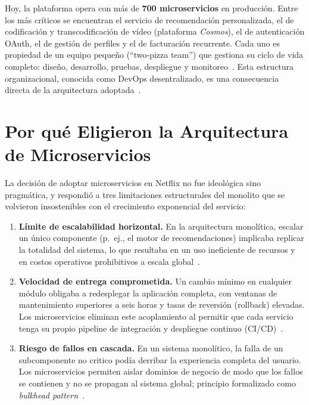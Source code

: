 \documentclass[11pt,a4paper]{article}
\begin{document}
Hoy, la plataforma opera con m\'as de \textbf{700 microservicios} en producci\'on. Entre los
m\'as cr\'iticos se encuentran el servicio de recomendaci\'on personalizada, el de codificaci\'on y
transcodificaci\'on de v\'ideo (plataforma \textit{Cosmos}), el de autenticaci\'on OAuth, el de
gesti\'on de perfiles y el de facturaci\'on recurrente. Cada uno es propiedad de un equipo
peque\~no (``two-pizza team'') que gestiona su ciclo de vida completo: dise\~no, desarrollo,
pruebas, despliegue y monitoreo~\cite{miguel2022}. Esta estructura organizacional,
conocida como DevOps desentralizado, es una consecuencia directa de la arquitectura
adoptada~\cite{balalaie2016}.

\section{Por qu\'e Eligieron la Arquitectura de Microservicios}

La decisi\'on de adoptar microservicios en Netflix no fue ideol\'ogica sino pragm\'atica, y
respondi\'o a tres limitaciones estructurales del monolito que se volvieron insostenibles
con el crecimiento exponencial del servicio:

\begin{enumerate}[leftmargin=*, label=\textbf{\arabic{enumi}.}]

  \item \textbf{L\'imite de escalabilidad horizontal.}
  En la arquitectura monol\'itica, escalar un \'unico componente (p.~ej., el motor de
  recomendaciones) implicaba replicar la totalidad del sistema, lo que resultaba en un
  uso ineficiente de recursos y en costos operativos prohibitivos a escala global~\cite{blinowski2022}.

  \item \textbf{Velocidad de entrega comprometida.}
  Un cambio m\'inimo en cualquier m\'odulo obligaba a redesplegar la aplicaci\'on completa,
  con ventanas de mantenimiento superiores a seis horas y tasas de reversi\'on (rollback)
  elevadas. Los microservicios eliminan este acoplamiento al permitir que cada servicio
  tenga su propio pipeline de integraci\'on y despliegue continuo (CI/CD)~\cite{balalaie2016}.

  \item \textbf{Riesgo de fallos en cascada.}
  En un sistema monol\'itico, la falla de un subcomponente no criti\-co pod\'ia derribar la
  experiencia completa del usuario. Los microservicios permiten aislar dominios de negocio
  de modo que los fallos se contienen y no se propagan al sistema global; principio
  formalizado como \textit{bulkhead pattern}~\cite{dragoni2017}.

\end{enumerate}
\end{document}
